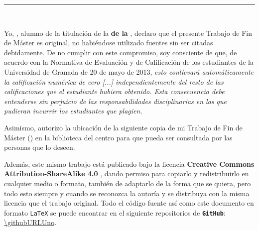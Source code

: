 \thispagestyle{empty}

\begin{minipage}{\textwidth}


    \begin{minipage}{\textwidth}
    
        \vspace{0.5cm}

        \noindent\rule[-1ex]{\textwidth}{2pt}\\[4ex]
    
    \end{minipage}
    
    \begin{minipage}{\textwidth}
       Yo, \textbf{\nombreAlumno}, alumno de la titulación \textbf{\titulacion} de la \textbf{\etsiitname de la \universidad}, declaro que el presente Trabajo de Fin de Máster es original, no habiéndose utilizado fuentes sin ser citadas debidamente. De no cumplir con este compromiso, soy consciente de que, de acuerdo con la Normativa de Evaluación y de Calificación de los estudiantes de la Universidad de Granada de 20 de mayo de 2013, \textit{esto conllevará automáticamente la calificación numérica de cero [...] independientemente del resto de las calificaciones que el estudiante hubiera obtenido. Esta consecuencia debe entenderse sin perjuicio de las responsabilidades disciplinarias en las que pudieran incurrir los estudiantes que plagien.}
    \end{minipage}


    \begin{minipage}{\textwidth}
        \bigskip
        Asimismo, autorizo la ubicación de la siguiente copia de mi Trabajo de Fin de Máster (\textit{\tituloProyecto}) en la biblioteca del centro para que pueda ser consultada por las personas que lo deseen.
        
        \bigskip
        Además, este mismo trabajo está publicado bajo la licencia \textbf{Creative Commons Attribution-ShareAlike 4.0} \cite{creative_commons}, dando permiso para copiarlo y redistribuirlo en cualquier medio o formato, también de adaptarlo de la forma que se quiera, pero todo esto siempre y cuando se reconozca la autoría y se distribuya con la misma licencia que el trabajo original. Todo el código fuente así como este documento en formato {\tt LaTeX} se puede encontrar en el siguiente repositorios de {\tt \textbf{GitHub}}: \url{\githubURLUno}.
    
    \end{minipage}


\end{minipage}
